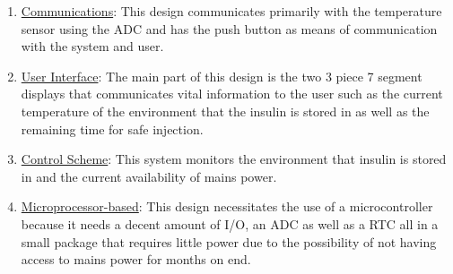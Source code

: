 \begin{enumerate}
  \item \underline{Communications}: This design communicates primarily with the temperature sensor using the ADC and has the push button as means of communication with the system and user.
  \item \underline{User Interface}: The main part of this design is the two 3 piece 7 segment displays that communicates vital information to the user such as the current temperature of the environment that the insulin is stored in as well as the remaining time for safe injection.
  \item \underline{Control Scheme}: This system monitors the environment that insulin is stored in and the current availability of mains power.
  \item \underline{Microprocessor-based}: This design necessitates the use of a microcontroller because it needs a decent amount of I/O, an ADC as well as a RTC all in a small package that requires little power due to the possibility of not having access to mains power for months on end.
\end{enumerate}
